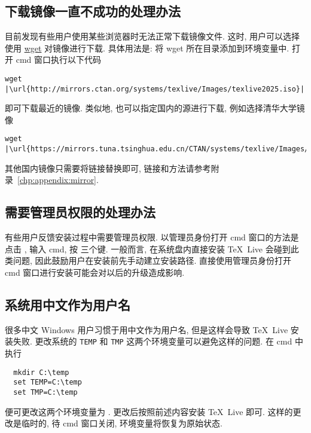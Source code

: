 \subsection{下载镜像一直不成功的处理办法}

目前发现有些用户使用某些浏览器时无法正常下载镜像文件.
这时,
用户可以选择使用 \href{https://eternallybored.org/misc/wget/}{\textsf{wget}} 对镜像进行下载.
具体用法是:
将 \textsf{wget} 所在目录添加到环境变量中.
打开 \textsf{cmd} 窗口执行以下代码
\begin{lstlisting}[escapechar = |]
  wget |\url{http://mirrors.ctan.org/systems/texlive/Images/texlive2025.iso}|
\end{lstlisting}
即可下载最近的镜像.
类似地,
也可以指定国内的源进行下载,
例如选择清华大学镜像
\begin{lstlisting}[escapechar = |]
  wget |\url{https://mirrors.tuna.tsinghua.edu.cn/CTAN/systems/texlive/Images/texlive2025.iso}|
\end{lstlisting}
其他国内镜像只需要将链接替换即可,
链接和方法请参考附录~\ref{chp:appendix:mirror}.

\subsection{需要管理员权限的处理办法}

有些用户反馈安装过程中需要管理员权限.
以管理员身份打开 \textsf{cmd} 窗口的方法是点击 \keys{\faWindows},
输入 \textsf{cmd},
按 \keys{\ctrl + \shift + \enter} 三个键.
一般而言,
在系统盘内直接安装 \TeX~Live 会碰到此类问题,
因此鼓励用户在安装前先手动建立安装路径.
直接使用管理员身份打开 \textsf{cmd} 窗口进行安装可能会对以后的升级造成影响.

\subsection{系统用中文作为用户名}\label{sec:chinesename}

很多中文 Windows 用户习惯于用中文作为用户名,
但是这样会导致 \TeX~Live 安装失败.
更改系统的 \texttt{TEMP} 和 \texttt{TMP} 这两个环境变量可以避免这样的问题.
在 \textsf{cmd} 中执行
\begin{lstlisting}
  mkdir C:\temp
  set TEMP=C:\temp
  set TMP=C:\temp
\end{lstlisting}
便可更改这两个环境变量为 .
更改后按照前述内容安装 \TeX~Live 即可.
这样的更改是临时的,
待 \textsf{cmd} 窗口关闭,
环境变量将恢复为原始状态.

